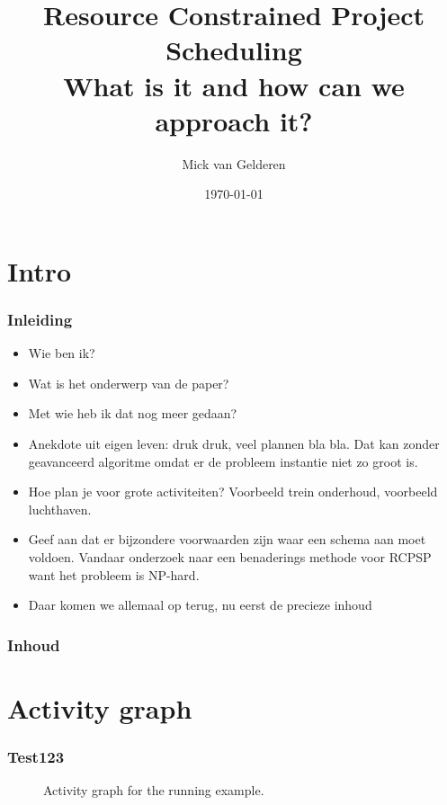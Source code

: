 \documentclass{beamer}
\title[RCPS]{Resource Constrained Project Scheduling\\
What is it and how can we approach it?}
\author{Mick van Gelderen}
\institute{TU Delft}
\date{\today}
\theoremstyle{definition}
\newcommand{\inputtikz}[1]{}
\begin{document}
\begin{frame}
\titlepage
\end{frame}

\section*{Intro}
\begin{frame}
    \frametitle{Inleiding}
    \begin{itemize}
        \item Wie ben ik?
        \item Wat is het onderwerp van de paper?
        \item Met wie heb ik dat nog meer gedaan?
        \item Anekdote uit eigen leven: druk druk, veel plannen bla bla. Dat kan zonder geavanceerd algoritme omdat er de probleem instantie niet zo groot is. 
        \item Hoe plan je voor grote activiteiten? Voorbeeld trein onderhoud, voorbeeld luchthaven. 
        \item Geef aan dat er bijzondere voorwaarden zijn waar een schema aan moet voldoen.  Vandaar onderzoek naar een benaderings methode voor  RCPSP want het probleem is NP-hard. 
        \item Daar komen we allemaal op terug, nu eerst de precieze inhoud
    \end{itemize}
\end{frame}

\begin{frame}
    \frametitle{Inhoud}
    \tableofcontents
\end{frame}


\section{Activity graph}
\begin{frame}
	\frametitle{Test123}
	\vspace{-1em}
	\begin{figure}[ht]
		\makebox[\textwidth][c]{\resizebox{.7\paperwidth}{!}{
			\inputtikz{schedule_comparison}
		}}
		\vspace{-1em}
		\caption{Activity graph for the running example.}
		\label{fig:activity_graph}
	\end{figure}
\end{frame}
\end{document}
